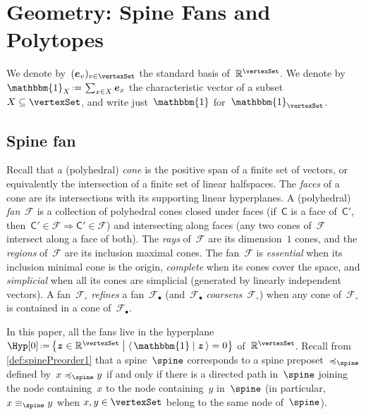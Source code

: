 \documentclass{amsart}
\theoremstyle{definition}
\newcommand{\R}{\mathbb{R}} %
\renewcommand{\c}[1]{{\mathcal{#1}}} %
\renewcommand{\b}[1]{{\boldsymbol{#1}}} %
\newcommand{\bigset}[2]{\big\{ #1 \;\big|\; #2 \big\}} %
\newcommand{\dotprod}[2]{\langle \, #1 \; | \; #2 \, \rangle} %
\newcommand{\one}{\mathbbm{1}} %
\newcommand{\eqdef}{\mbox{\,\raisebox{0.2ex}{\scriptsize\ensuremath{\mathrm:}}\ensuremath{=}\,}} %
\newcommand{\eg}{\textit{e.g.}~} %
\newcommand{\darkblue}{\color{darkblue}} %
\newcommand{\defn}[1]{\textsl{\darkblue #1}} %
\newcommand{\polytope}[1]{\mathsf{#1}} %
\newcommand{\weight}{\omega} %
\begin{document}

\section{Geometry: Spine Fans and Polytopes}
\label{sec:geometry}

We denote by~$(\b{e}_v)_{v \in \vertexSet}$ the standard basis of~$\R^{\vertexSet}$.
We denote by~$\one_X \eqdef \sum_{x \in X} \b{e}_x$ the characteristic vector of a subset~$X \subseteq \vertexSet$, and write just~$\one$ for~$\one_{\vertexSet}$.


\subsection{Spine fan}
\label{subsec:spineFan}

%
Recall that a (polyhedral) \defn{cone} is the positive span of a finite set of vectors, or equivalently the intersection of a finite set of linear halfspaces.
The \defn{faces} of a cone are its intersections with its supporting linear hyperplanes.
A (polyhedral) \defn{fan}~$\c{F}$ is a collection of polyhedral cones closed under faces (if~$\polytope{C}$ is a face of~$\polytope{C'}$, then~$\polytope{C'} \in \c{F} \Rightarrow \polytope{C'} \in \c{F}$) and intersecting along faces (any two cones of~$\c{F}$ intersect along a face of both).
The \defn{rays} of~$\c{F}$ are its dimension~$1$ cones, and the \defn{regions} of~$\c{F}$ are its inclusion maximal cones.
The fan~$\c{F}$ is \defn{essential} when its inclusion minimal cone is the origin, \defn{complete} when its cones cover the space, and \defn{simplicial} when all its cones are simplicial (generated by linearly independent vectors).
A fan~$\c{F}_\circ$ \defn{refines} a fan~$\c{F}_\bullet$ (and~$\c{F}_\bullet$ \defn{coarsens}~$\c{F}_\circ$) when any cone of~$\c{F}_\circ$ is contained in a cone of~$\c{F}_\bullet$.

In this paper, all the fans live in the hyperplane~${\Hyp[0] \eqdef \bigset{\b{z} \in \R^{\vertexSet}}{\dotprod{\one}{\b{z}} = 0}}$ of~$\R^{\vertexSet}$.
Recall from \cref{def:spinePreorder1} that a spine~$\spine$ corresponds to a spine preposet~$\preccurlyeq_{\spine}$ defined by~$x \preccurlyeq_{\spine} y$ if and only if there is a directed path in~$\spine$ joining the node containing~$x$ to the node containing~$y$ in~$\spine$ (in particular, $x \equiv_{\spine} y$ when $x,y \in \vertexSet$ belong to the same node of~$\spine$).
\end{document}
